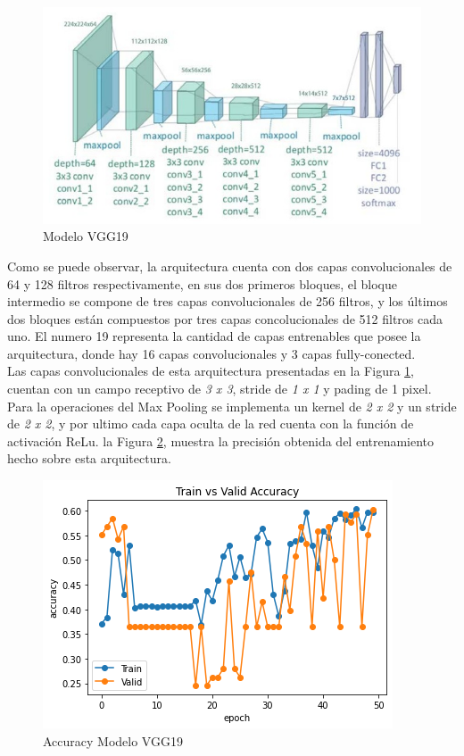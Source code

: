 \newpage
\begin{figure}[ht]
	\centering
	\includegraphics[scale=0.38]{Figs/22.jpeg}
	\caption{Modelo VGG19}
	\label{fig:VGG19}
\end{figure}			


Como se puede observar, la arquitectura cuenta con dos capas convolucionales de 64 y 128 filtros respectivamente, en sus dos primeros bloques, el bloque intermedio se compone de tres capas convolucionales de 256 filtros, y los últimos dos bloques están compuestos por tres capas concolucionales de 512 filtros cada uno. El numero 19 representa la cantidad de capas entrenables que posee la arquitectura, donde hay 16 capas convolucionales y 3 capas fully-conected.\\			

Las capas convolucionales de esta arquitectura presentadas en la Figura \ref{fig:VGG19}, cuentan con un campo receptivo de \textit{3 x 3}, stride de \textit{1 x 1} y pading de 1 pixel. Para la operaciones del Max Pooling se implementa un kernel de \textit{2 x 2} y un stride de \textit{2 x 2}, y por ultimo cada capa oculta de la red cuenta con la función de activación ReLu. la Figura \ref{fig:VGG19_accuracy}, muestra la precisión obtenida del entrenamiento hecho sobre esta arquitectura.


\begin{figure}[ht]
	\centering
	\includegraphics[scale=0.5]{Figs/101.png}
	\caption{Accuracy Modelo VGG19}
	\label{fig:VGG19_accuracy}
\end{figure}  

